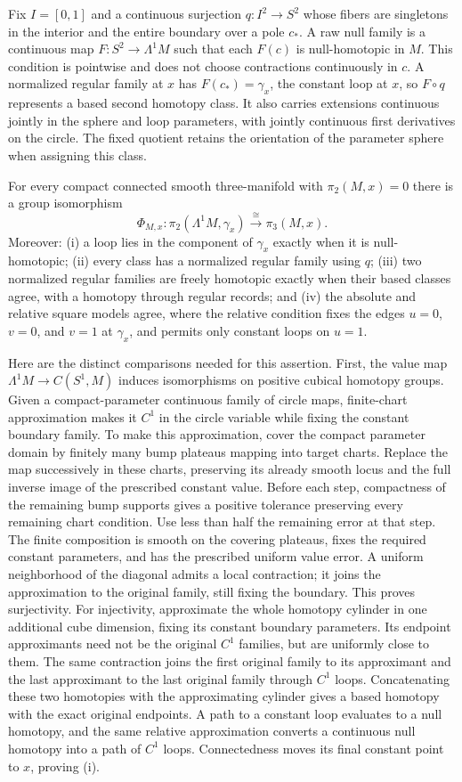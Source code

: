 Fix $I=[0,1]$ and a continuous surjection $q:I^2\to S^2$ whose fibers are
singletons in the interior and the entire boundary over a pole $c_*$. A
raw null family is a continuous map $F:S^2\to\Lambda^1M$ such that each
$F(c)$ is null-homotopic in $M$. This condition is pointwise and does not
choose contractions continuously in $c$. A normalized regular family at
$x$ has $F(c_*)=\gamma_x$, the constant loop at $x$, so $F\circ q$
represents a based second homotopy class. It also carries extensions
continuous jointly in the sphere and loop parameters, with jointly
continuous first derivatives on the circle. The fixed quotient retains
the orientation of the parameter sphere when assigning this class.

For every compact connected smooth three-manifold with $\pi_2(M,x)=0$
there is a group isomorphism
\[
 \Phi_{M,x}:\pi_2(\Lambda^1 M,\gamma_x)\xrightarrow{\cong}\pi_3(M,x).
\]
Moreover: (i) a loop lies in the component of $\gamma_x$ exactly when it
is null-homotopic; (ii) every class has a normalized regular family using $q$;
(iii) two normalized regular families are freely homotopic exactly when their
based classes agree, with a homotopy through regular records; and (iv) the
absolute and relative square models agree, where the relative condition
fixes the edges $u=0$, $v=0$, and $v=1$ at $\gamma_x$, and permits only
constant loops on $u=1$.

Here are the distinct comparisons needed for this assertion. First, the
value map $\Lambda^1M\to C(S^1,M)$ induces isomorphisms on positive
cubical homotopy groups. Given a compact-parameter continuous family of
circle maps, finite-chart approximation makes it $C^1$ in the circle
variable while fixing the constant boundary family. To make this
approximation, cover the compact parameter domain by finitely many
bump plateaus mapping into target charts. Replace the map successively
in these charts, preserving its already smooth locus and the full
inverse image of the prescribed constant value. Before each step,
compactness of the remaining bump supports gives a positive tolerance
preserving every remaining chart condition. Use less than half the
remaining error at that step. The finite composition is smooth on
the covering plateaus, fixes the required constant parameters, and
has the prescribed uniform value error. A uniform
neighborhood of the diagonal admits a local contraction; it joins the
approximation to the original family, still fixing the boundary.
This proves surjectivity. For injectivity, approximate the whole
homotopy cylinder in one additional cube dimension, fixing its
constant boundary parameters. Its endpoint approximants need not be
the original $C^1$ families, but are uniformly close to them. The
same contraction joins the first original family to its approximant
and the last approximant to the last original family through $C^1$
loops. Concatenating these two homotopies with the approximating
cylinder gives a based homotopy with the exact original endpoints.
A path to a constant loop evaluates to a null
homotopy, and the same relative approximation converts a continuous null
homotopy into a path of $C^1$ loops. Connectedness moves its final constant
point to $x$, proving (i).

